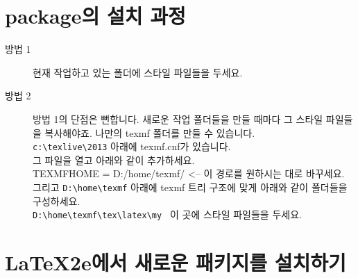 	\clearpage
	\section{package의 설치 과정}


		 	\begin{description}
			\item[방법 1]
					현재 작업하고 있는 폴더에 스타일 파일들을 두세요.
			\item[방법 2]
					방법 1의 단점은 뻔합니다. 새로운 작업 폴더들을 만들 때마다 그 스타일 파일들을 복사해야죠.
					나만의 texmf 폴더를 만들 수 있습니다. \\
					\verb|c:\texlive\2013| 아래에 texmf.cnf가 있습니다. \\
					그 파일을 열고 아래와 같이 추가하세요. \\
					TEXMFHOME = D:/home/texmf/  <-- 이 경로를 원하시는 대로 바꾸세요. \\
					그리고 \verb|D:\home\texmf| 아래에 texmf 트리 구조에 맞게 아래와 같이 폴더들을 구성하세요. \\
					\verb|D:\home\texmf\tex\latex\my |
					이 곳에 스타일 파일들을 두세요. 
		 	\end{description}
		
		
	\clearpage
	\section{LaTeX2e에서 새로운 패키지를 설치하기}

